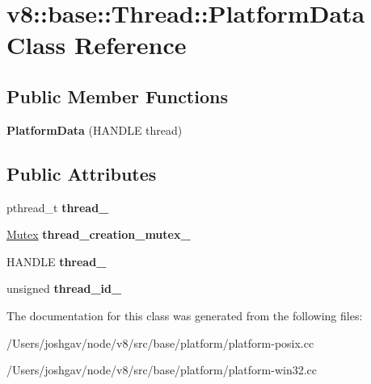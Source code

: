 \hypertarget{classv8_1_1base_1_1_thread_1_1_platform_data}{}\section{v8\+:\+:base\+:\+:Thread\+:\+:Platform\+Data Class Reference}
\label{classv8_1_1base_1_1_thread_1_1_platform_data}
\subsection*{Public Member Functions}
\begin{DoxyCompactItemize}
\item 
{\bfseries Platform\+Data} (H\+A\+N\+D\+LE thread)\hypertarget{classv8_1_1base_1_1_thread_1_1_platform_data_ae37fb80a5cf240ca10435552653cf87b}{}\label{classv8_1_1base_1_1_thread_1_1_platform_data_ae37fb80a5cf240ca10435552653cf87b}

\end{DoxyCompactItemize}
\subsection*{Public Attributes}
\begin{DoxyCompactItemize}
\item 
pthread\+\_\+t {\bfseries thread\+\_\+}\hypertarget{classv8_1_1base_1_1_thread_1_1_platform_data_a1d17ab6fadf784dc0c53a1a6e6108969}{}\label{classv8_1_1base_1_1_thread_1_1_platform_data_a1d17ab6fadf784dc0c53a1a6e6108969}

\item 
\hyperlink{classv8_1_1base_1_1_mutex}{Mutex} {\bfseries thread\+\_\+creation\+\_\+mutex\+\_\+}\hypertarget{classv8_1_1base_1_1_thread_1_1_platform_data_a5822687e07ab3a414b12712f828b637f}{}\label{classv8_1_1base_1_1_thread_1_1_platform_data_a5822687e07ab3a414b12712f828b637f}

\item 
H\+A\+N\+D\+LE {\bfseries thread\+\_\+}\hypertarget{classv8_1_1base_1_1_thread_1_1_platform_data_a5dda2be4239e78fa4b5d5db197665452}{}\label{classv8_1_1base_1_1_thread_1_1_platform_data_a5dda2be4239e78fa4b5d5db197665452}

\item 
unsigned {\bfseries thread\+\_\+id\+\_\+}\hypertarget{classv8_1_1base_1_1_thread_1_1_platform_data_a1c0d095a22bab8a4be281c96be6a5ca2}{}\label{classv8_1_1base_1_1_thread_1_1_platform_data_a1c0d095a22bab8a4be281c96be6a5ca2}

\end{DoxyCompactItemize}


The documentation for this class was generated from the following files\+:\begin{DoxyCompactItemize}
\item 
/\+Users/joshgav/node/v8/src/base/platform/platform-\/posix.\+cc\item 
/\+Users/joshgav/node/v8/src/base/platform/platform-\/win32.\+cc\end{DoxyCompactItemize}
